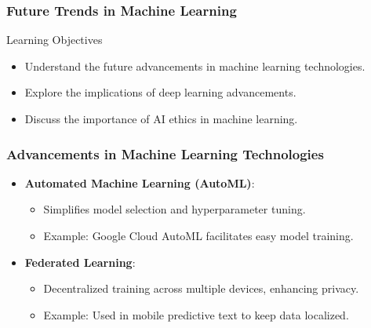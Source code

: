 \documentclass[aspectratio=169]{beamer}
\begin{document}
\begin{frame}[fragile]
    \frametitle{Future Trends in Machine Learning}
    \begin{block}{Learning Objectives}
        \begin{itemize}
            \item Understand the future advancements in machine learning technologies.
            \item Explore the implications of deep learning advancements.
            \item Discuss the importance of AI ethics in machine learning.
        \end{itemize}
    \end{block}
\end{frame}

\begin{frame}[fragile]
    \frametitle{Advancements in Machine Learning Technologies}
    \begin{itemize}
        \item \textbf{Automated Machine Learning (AutoML)}:
            \begin{itemize}
                \item Simplifies model selection and hyperparameter tuning.
                \item Example: Google Cloud AutoML facilitates easy model training.
            \end{itemize}

        \item \textbf{Federated Learning}:
            \begin{itemize}
                \item Decentralized training across multiple devices, enhancing privacy.
                \item Example: Used in mobile predictive text to keep data localized.
            \end{itemize}
    \end{itemize}
\end{frame}
\end{document}
